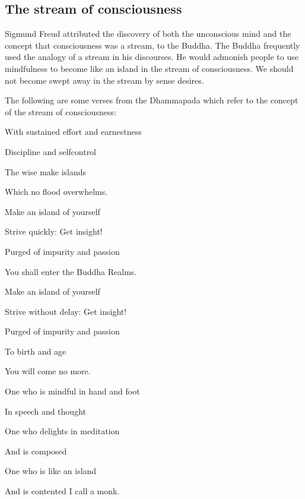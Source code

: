 \documentclass[a5paper,10pt,english]{book}
\begin{document}
\subsection{The stream of consciousness}
\label{\detokenize{saints:the-stream-of-consciousness}}
\sphinxAtStartPar
Sigmund Freud attributed the discovery of both the unconscious mind and
the concept that consciousness was a stream, to the Buddha. The Buddha
frequently used the analogy of a stream in his discourses. He would
admonish people to use mindfulness to become like an island in the
stream of consciousness. We should not become swept away in the stream
by sense desires.

\sphinxAtStartPar
The following are some verses from the Dhammapada which refer to the
concept of the stream of consciousness:

\begin{DUlineblock}{0em}
\item[] 
\item[] With sustained effort and earnestness
\item[] Discipline and self\sphinxhyphen{}control
\item[] The wise make islands
\item[] Which no flood overwhelms.
\end{DUlineblock}

\begin{DUlineblock}{0em}
\item[] 
\item[] Make an island of yourself
\item[] Strive quickly: Get insight!
\item[] Purged of impurity and passion
\item[] You shall enter the Buddha Realms.
\end{DUlineblock}

\begin{DUlineblock}{0em}
\item[] 
\item[] Make an island of yourself
\item[] Strive without delay: Get insight!
\item[] Purged of impurity and passion
\item[] To birth and age
\item[] You will come no more.
\end{DUlineblock}

\begin{DUlineblock}{0em}
\item[] 
\item[] One who is mindful in hand and foot
\item[] In speech and thought
\item[] One who delights in meditation
\item[] And is composed
\item[] One who is like an island
\item[] And is contented I call a monk.
\end{DUlineblock}
\end{document}
